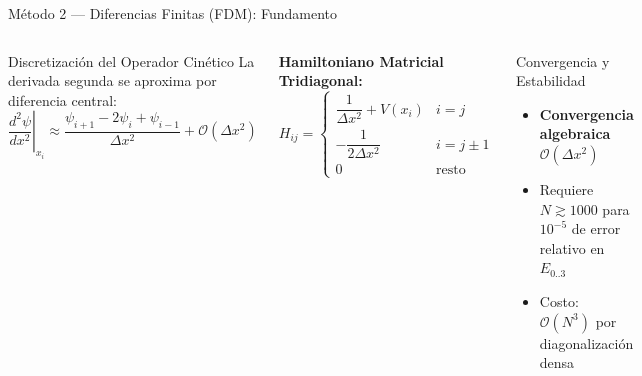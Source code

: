 \documentclass[aspectratio=169,10pt]{beamer}
\begin{document}
\begin{frame}{Método 2 — Diferencias Finitas (FDM): Fundamento}
\begin{columns}[T]
\begin{physbox}{Discretización del Operador Cinético}
La derivada segunda se aproxima por diferencia central:
\[
  \left.\frac{d^2\psi}{dx^2}\right|_{x_i} \approx \frac{\psi_{i+1} - 2\psi_i + \psi_{i-1}}{\Delta x^2} + \mathcal{O}(\Delta x^2)
\]
\end{physbox}

\vspace{0.18cm}
\textbf{Hamiltoniano Matricial Tridiagonal:}
\[
  H_{ij} = \begin{cases}
    \dfrac{1}{\Delta x^2} + V(x_i) & i=j\\[6pt]
    -\dfrac{1}{2\Delta x^2} & i=j\pm 1\\[4pt]
    0 & \text{resto}
  \end{cases}
\]

\vspace{0.135cm}
\begin{block}{Convergencia y Estabilidad}
\begin{itemize}\setlength\itemsep{2pt}
  \item \textbf{Convergencia algebraica} $\mathcal{O}(\Delta x^2)$
  \item Requiere $N \gtrsim 1000$ para $10^{-5}$ de error relativo en $E_{0..3}$
  \item Costo: $\mathcal{O}(N^3)$ por diagonalización densa
\end{itemize}
\end{block}


\end{columns}
\end{frame}
\end{document}
